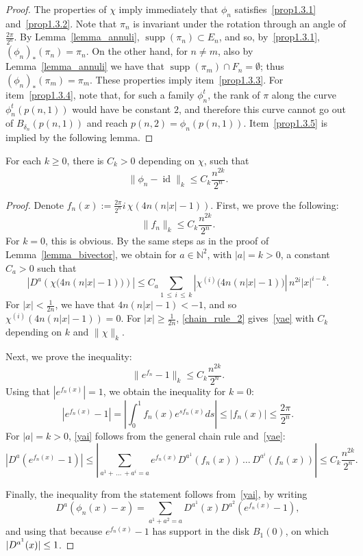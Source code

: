 \documentclass[AHL,Unicode,published]{cedram}
\newcommand{\N}{\mathbb{N}}
\newcommand{\norm}[1]{\|#1\|}
\DeclareMathOperator{\id}{id}
\DeclareMathOperator{\supp}{supp}
\begin{document}
\begin{proof}
The properties of $\chi$ imply immediately that $\phi_n$ satisfies~\eqref{prop1.3.1} and~\eqref{prop1.3.2}. Note that $\pi_n$ is invariant under the rotation through an angle of $\frac{2\pi}{2^n}$. By Lemma~\ref{lemma_annuli}, $\supp(\pi_n)\subset E_n$, and so, by~\eqref{prop1.3.1}, $(\phi_n)_*(\pi_n)=\pi_n$. On the other hand, for $n\neq m$, also by Lemma~\ref{lemma_annuli} we have that $\supp({\pi}_m)\cap F_n=\emptyset$; thus $(\phi_n)_*(\pi_m)=\pi_m$. These properties imply item~\eqref{prop1.3.3}. For item~\eqref{prop1.3.4}, note that, for such a family $\phi_n^t$, the rank of $\pi$ along the curve $\phi_n^t(p(n,1))$ would have be constant $2$, and therefore this curve cannot go out of $B_{\delta_n}(p(n,1))$ and reach $p(n,2)=\phi_n(p(n,1))$. Item~\eqref{prop1.3.5} is implied by the following lemma.
\end{proof}

\begin{lemm}\label{lemma_inequality}
For each $k\geq 0$, there is $C_k>0$ depending on $\chi$, such that
\[
\norm{\phi_{n}-\id}_{k}\leq C_k \frac{n^{2k}}{2^n}.
\]
\end{lemm}


\begin{proof}
Denote $f_n(x):=\frac{2\pi}{2^n}i\, \chi(4n(n|x|-1))$. First, we prove the following:
\begin{equation}\label{yae}
\norm{f_n}_k\leq C_k\frac{n^{2k}}{2^n}.
\end{equation}
For $k=0$, this is obvious. By the same steps as in the proof of Lemma~\ref{lemma_bivector}, we obtain for $a\in \N^2$, with $|a|=k>0$, a constant $C_a>0$ such that
\begin{equation}\label{chain_rule_2}
\left|D^a\left(\chi\big(4n(n|x|-1)\big)\right)\right|\leq C_a\sum_{1\,\leq\,i\,\leq\,k}\left|\chi^{(i)}\big(4n(n|x|-1)\big)\right|\, n^{2i} |x|^{i-k}.
\end{equation}
For $|x|<\frac{1}{2n}$, we have that $4n(n|x|-1)<-1$, and so $\chi^{(i)}(4n(n|x|-1))=0$. For $|x|\geq \frac{1}{2n}$, \eqref{chain_rule_2} gives~\eqref{yae} with $C_k$ depending on $k$ and $\norm{\chi}_k$.

Next, we prove the inequality:
\begin{equation}\label{yai}
\norm{e^{f_n}-1}_k\leq C_k\frac{n^{2k}}{2^n}.
\end{equation}
Using that $|e^{f_n(x)}|=1$, we obtain the inequality for $k=0$:
\[
\left|e^{f_n(x)}-1\right|=\left|\int_0^1f_n(x)e^{s f_n(x)}d s\right|\leq \left|f_n(x)\right|\leq \frac{2\pi}{2^n}.
\]
For $|a|=k>0$, \eqref{yai} follows from the general chain rule and~\eqref{yae}:
\[
\left|D^a(e^{f_n(x)}-1)\right|\leq \left|\sum_{a^1+\,\ldots\,+a^i=a}e^{f_{n}(x)}D^{a^1}\left(f_n(x)\right)\,\ldots\,D^{a^i}\left(f_n(x)\right)\right|\leq C_k\frac{n^{2k}}{2^n}.
\]

Finally, the inequality from the statement follows from~\eqref{yai}, by writing
\[
D^a\left(\phi_n(x)-x\right)=\sum_{a^1+a^2=a}D^{a^1}(x)D^{a^2}\left(e^{f_n(x)}-1\right),
\]
and using that because $e^{f_n(x)}-1$ has support in the disk $B_1(0)$, on which $|D^{a^1}(x)|\linebreak\leq 1$.
\end{proof}
\end{document}
